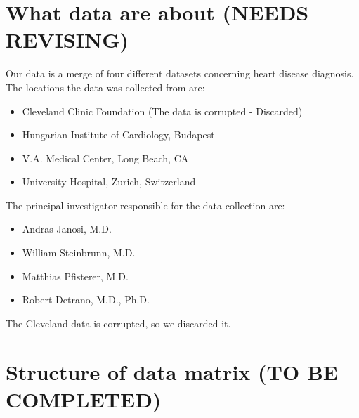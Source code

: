 \documentclass[a4paper,12pt]{article}
\begin{document}
\section{What data are about (\textbf{NEEDS REVISING})} 

    Our data is a merge of four different datasets concerning heart disease diagnosis. The locations the data was collected from are:
    
    \begin{itemize}
    
        \item Cleveland Clinic Foundation (The data is corrupted - Discarded)
        \item Hungarian Institute of Cardiology, Budapest
        \item V.A. Medical Center, Long Beach, CA
        \item University Hospital, Zurich, Switzerland
        
    \end{itemize}
    
    The principal investigator responsible for the data collection are:
    
    \begin{itemize}
    
        \item Andras Janosi, M.D.
        \item William Steinbrunn, M.D.
        \item Matthias Pfisterer, M.D.
        \item Robert Detrano, M.D., Ph.D.
        
    \end{itemize}
    
    The Cleveland data is corrupted, so we discarded it.

\section{Structure of data matrix (\textbf{TO BE COMPLETED})} 
\end{document}

